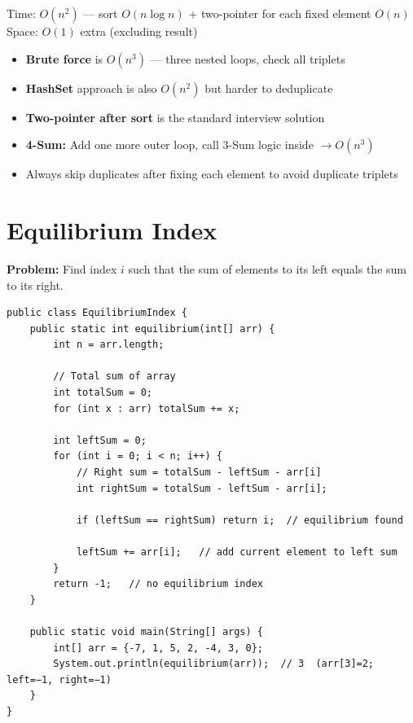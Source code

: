 \documentclass[12pt,a4paper,oneside]{book}
\begin{document}
\begin{complexity}
Time: $O(n^2)$ --- sort $O(n\log n)$ + two-pointer for each fixed element $O(n)$\quad Space: $O(1)$ extra (excluding result)
\end{complexity}

\begin{interviewcorner}
\begin{itemize}
  \item \textbf{Brute force} is $O(n^3)$ --- three nested loops, check all triplets
  \item \textbf{HashSet} approach is also $O(n^2)$ but harder to deduplicate
  \item \textbf{Two-pointer after sort} is the standard interview solution
  \item \textbf{4-Sum:} Add one more outer loop, call 3-Sum logic inside $\to O(n^3)$
  \item Always skip duplicates after fixing each element to avoid duplicate triplets
\end{itemize}
\end{interviewcorner}

\section{Equilibrium Index}

\textbf{Problem:} Find index $i$ such that the sum of elements to its left equals the sum to its right.

\begin{lstlisting}[caption={Equilibrium Index --- Prefix Sum approach}]
public class EquilibriumIndex {
    public static int equilibrium(int[] arr) {
        int n = arr.length;

        // Total sum of array
        int totalSum = 0;
        for (int x : arr) totalSum += x;

        int leftSum = 0;
        for (int i = 0; i < n; i++) {
            // Right sum = totalSum - leftSum - arr[i]
            int rightSum = totalSum - leftSum - arr[i];

            if (leftSum == rightSum) return i;  // equilibrium found

            leftSum += arr[i];   // add current element to left sum
        }
        return -1;   // no equilibrium index
    }

    public static void main(String[] args) {
        int[] arr = {-7, 1, 5, 2, -4, 3, 0};
        System.out.println(equilibrium(arr));  // 3  (arr[3]=2; left=−1, right=−1)
    }
}
\end{lstlisting}
\end{document}
